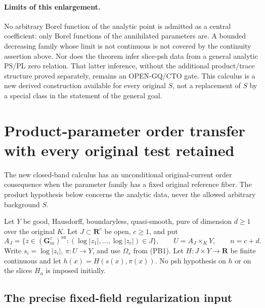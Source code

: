 \documentclass[11pt,a4paper]{article}
\numberwithin{equation}{section}
\theoremstyle{definition}
\theoremstyle{remark}
\begin{document}
\paragraph{Limits of this enlargement.}
No arbitrary Borel function of the analytic point is admitted as a
central coefficient: only Borel functions of the annihilated
parameters are. A bounded decreasing family whose limit is not
continuous is not covered by the continuity assertion above.
Nor does the theorem infer slice-psh data from a general analytic
PS/PL zero relation. That latter inference, without the additional
product/trace structure proved separately, remains an OPEN-GQ/CTO
gate. This calculus is a new derived construction available for
every original $S$, not a replacement of $S$ by a special class in
the statement of the general goal.



\section{Product-parameter order transfer with every original test retained}
\label{sec:r12-product-parameter-order}

The new closed-band calculus has an unconditional original-current
order consequence when the parameter family has a fixed original
reference fiber. The product hypothesis below concerns the analytic
data, never the allowed arbitrary background $S$.

Let $Y$ be good, Hausdorff, boundaryless, quasi-smooth, pure of
dimension $d\ge1$ over the original $K$. Let $J\subset\mathbf R^c$
be open, $c\ge1$, and put
\[
 A_J=\{z\in(\mathbf G_m^c)^{\mathrm{an}}:
                         (\log|z_1|,\ldots,\log|z_c|)\in J\},
 \qquad U=A_J\times_KY,
 \qquad n=c+d.
 \tag{PT1}
\]
Write $s_i=\log|z_i|$, $\pi:U\to Y$, and use $\Omega_s$ from
(PB1). Let $H:J\times Y\to\mathbf R$ be finite continuous and
let $h(x)=H(s(x),\pi(x))$. No psh hypothesis on $h$ or on the
slices $H_a$ is imposed initially.

\subsection{The precise fixed-field regularization input}
\end{document}
